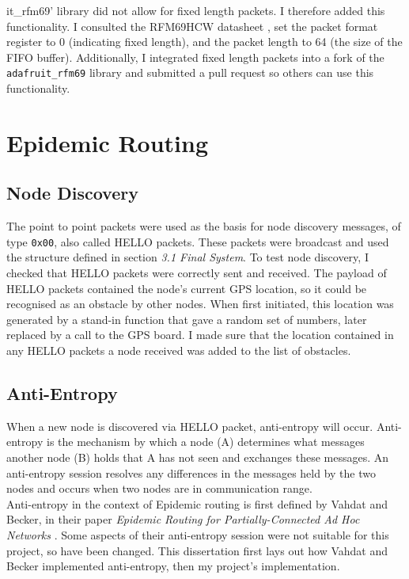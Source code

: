 \documentclass[12pt,a4paper]{report}
\begin{document}
it_rfm69' library did not allow for fixed length packets. I therefore added this functionality. I consulted the RFM69HCW datasheet \cite{radiodata}, set the packet format register to 0 (indicating fixed length), and the packet length to 64 (the size of the FIFO buffer). Additionally, I integrated fixed length packets into a fork of the \verb'adafruit_rfm69' library \cite{radiogit} and submitted a pull request so others can use this functionality. \\

\section{Epidemic Routing}
\subsection{Node Discovery}
The point to point packets were used as the basis for node discovery messages, of type \verb'0x00', also called HELLO packets. These packets were broadcast and used the structure defined in section \emph{3.1 Final System}. To test node discovery, I checked that HELLO packets were correctly sent and received. The payload of HELLO packets contained the node's current GPS location, so it could be recognised as an obstacle by other nodes. When first initiated, this location was generated by a stand-in function that gave a random set of numbers, later replaced by a call to the GPS board. I made sure that the location contained in any HELLO packets a node received was added to the list of obstacles. 

\subsection{Anti-Entropy}
When a new node is discovered via HELLO packet, anti-entropy will occur. Anti-entropy is the mechanism by which a node (A) determines what messages another node (B) holds that A has not seen and exchanges these messages. An anti-entropy session resolves any differences in the messages held by the two nodes and occurs when two nodes are in communication range. \\
Anti-entropy in the context of Epidemic routing is first defined by Vahdat and Becker, in their paper \emph{Epidemic Routing for Partially-Connected Ad Hoc Networks} \cite{epidemic}. Some aspects of their anti-entropy session were not suitable for this project, so have been changed. This dissertation first lays out how Vahdat and Becker implemented anti-entropy, then my project's implementation. 
\end{document}
